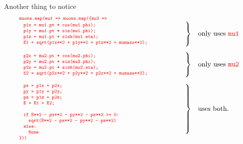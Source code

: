 \documentclass{beamer}
\begin{document}
\begin{frame}{Another thing to notice}
\[
\begin{array}{ll}
\mbox{\textcolor{red}{\tt\scriptsize muons.map(mu1 => muons.map(\{mu2 =>}} & \\

\left.\renewcommand{\arraystretch}{0.7}\begin{array}{p{8 cm}}
\mbox{\textcolor{red}{\tt\scriptsize p1x = mu1.pt * cos(mu1.phi);}} \\
\mbox{\textcolor{red}{\tt\scriptsize p1y = mu1.pt * sin(mu1.phi);}} \\
\mbox{\textcolor{red}{\tt\scriptsize p1z = mu1.pt * sinh(mu1.eta);}} \\
\mbox{\textcolor{red}{\tt\scriptsize E1 = sqrt(p1x**2 + p1y**2 + p1z**2 + mumass**2);}}
\end{array}\right\} &
\mbox{only uses \textcolor{red}{\tt mu1}} \\
& \\
\left.\renewcommand{\arraystretch}{0.7}\begin{array}{p{8 cm}}
\mbox{\textcolor{red}{\tt\scriptsize p2x = mu2.pt * cos(mu2.phi);}} \\
\mbox{\textcolor{red}{\tt\scriptsize p2y = mu2.pt * sin(mu2.phi);}} \\
\mbox{\textcolor{red}{\tt\scriptsize p2z = mu2.pt * sinh(mu2.eta);}} \\
\mbox{\textcolor{red}{\tt\scriptsize E2 = sqrt(p2x**2 + p2y**2 + p2z**2 + mumass**2);}}
\end{array}\right\} &
\mbox{only uses \textcolor{red}{\tt mu2}} \\
& \\
\left.\renewcommand{\arraystretch}{0.7}\begin{array}{p{8 cm}}
\mbox{\textcolor{red}{\tt\scriptsize px = p1x + p2x;}} \\
\mbox{\textcolor{red}{\tt\scriptsize py = p1y + p2y;}} \\
\mbox{\textcolor{red}{\tt\scriptsize pz = p1z + p2z;}} \\
\mbox{\textcolor{red}{\tt\scriptsize E = E1 + E2;}} \\
\mbox{\textcolor{red}{\tt\scriptsize }} \\
\mbox{\textcolor{red}{\tt\scriptsize if E**2 - px**2 - py**2 - pz**2 >= 0:}} \\
\mbox{\textcolor{red}{\tt\scriptsize \hspace{0.25 cm}sqrt(E**2 - px**2 - py**2 - pz**2)}} \\
\mbox{\textcolor{red}{\tt\scriptsize else:}} \\
\mbox{\textcolor{red}{\tt\scriptsize \hspace{0.25 cm}None}}
\end{array}\right\} &
\mbox{uses both.} \\
\mbox{\textcolor{red}{\tt\scriptsize \}))}} & \\
\end{array}
\]
\end{frame}
\end{document}
